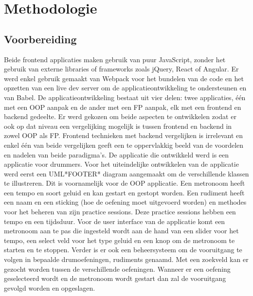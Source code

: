 
\chapter{Methodologie}
\label{ch:methodologie}


\section{Voorbereiding}
 Beide frontend applicaties maken gebruik van puur JavaScript, zonder het gebruik van externe libraries of frameworks zoals jQuery, React of Angular. Er werd enkel gebruik gemaakt van Webpack voor het bundelen van de code en het opzetten van een live dev server om de applicatieontwikkeling te ondersteunen en van Babel. De applicatieontwikkeling bestaat uit vier delen: twee applicaties, één met een OOP aanpak en de ander met een FP aanpak, elk met een frontend en backend gedeelte. Er werd gekozen om beide aspecten te ontwikkelen zodat er ook op dat niveau een vergelijking mogelijk is tussen frontend en backend in zowel OOP als FP. Frontend technieken met backend vergelijken is irrelevant en enkel één van beide vergelijken geeft een te oppervlakkig beeld van de voordelen en nadelen van beide paradigma's. De applicatie die ontwikkeld werd is een applicatie voor drummers. Voor het uiteindelijke ontwikkelen van de applicatie werd eerst een UML*FOOTER* diagram aangemaakt om de verschillende klassen te illustreren. Dit is voornamelijk voor de OOP applicatie. Een metronoom heeft een tempo en soort geluid en kan gestart en gestopt worden. Een rudiment heeft een naam en een sticking (hoe de oefening moet uitgevoerd worden) en methodes voor het beheren van zijn practice sessions. Deze practice sessions hebben een tempo en een tijdsduur. Voor de user interface van de applicatie komt een metronoom aan te pas die ingesteld wordt aan de hand van een slider voor het tempo, een select veld voor het type geluid en een knop om de metronoom te starten en te stoppen. Verder is er ook een beheersysteem om de vooruitgang te volgen in bepaalde drumoefeningen, rudiments genaamd. Met een zoekveld kan er gezocht worden tussen de verschillende oefeningen. Wanneer er een oefening geselecteerd wordt en de metronoom wordt gestart dan zal de vooruitgang gevolgd worden en opgeslagen.

